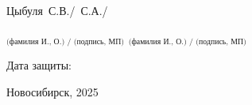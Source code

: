\begin{titlepage}
\begin{spacing}{1.15}
\noindent
Цыбуля~С.В./~С.А./

\noindent
$_\text{(фамилия И., О.) / (подпись, МП)}$ \hfill $_\text{(фамилия И., О.) / (подпись, МП)}$
\vspace{10pt}

\noindent
\writedate\hfill\writedate{}
\vspace{8mm}

\hfill Дата защиты:\writedate{}
\vspace{8mm}

\begin{center}
    Новосибирск, 2025
\end{center}

\end{spacing}
\end{titlepage}